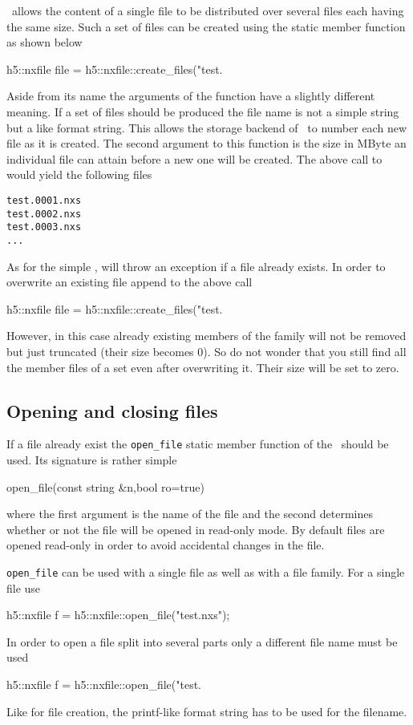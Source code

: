\libpniio\ allows the content of a single file to be distributed over several
files each having the same size. Such a set of files can be created using the 
 static member function as shown below
\begin{cppcode}
h5::nxfile file = h5::nxfile::create_files("test.%
\end{cppcode}
Aside from its name the arguments of the  function have 
a slightly different meaning. If a set of files should be produced the file name
is not a simple string but a  like format string. This allows the
storage backend of \libpniio\ to number each new file as it is created.
The second argument to this function is the size in MByte an individual file can 
attain before a new one will be created. The above call to 
would yield the following files
\begin{verbatim}
test.0001.nxs
test.0002.nxs
test.0003.nxs
...
\end{verbatim}
As for the simple ,  will throw an
 exception if a file already exists. In order to overwrite an
existing file append  to the above call 
\begin{cppcode}
h5::nxfile file = h5::nxfile::create_files("test.%
\end{cppcode}
However, in this case already existing members of the family will not be removed
but just truncated (their size becomes $0$). So do not wonder that you still
find all the member files of a set even after overwriting it. Their size will be
set to zero.

\subsection{Opening and closing files}

If a file already exist the \texttt{open\_file} static member function of the
\nxfile\ should be used.  Its signature is rather simple 
\begin{cppcode}
open_file(const string &n,bool ro=true)
\end{cppcode}
where the first argument is the name of the file and the second determines
whether or not the file will be opened in read-only mode. By default files are
opened read-only in order to avoid accidental changes in the file. 

\texttt{open\_file} can be used with a single file as well as with a file
family. For a single file use 
\begin{cppcode}
h5::nxfile f = h5::nxfile::open_file("test.nxs");
\end{cppcode}
In order to open a file split into several parts only a different file name 
must be used
\begin{cppcode}
h5::nxfile f = h5::nxfile::open_file("test.%
\end{cppcode}
Like for file creation, the printf-like format string has to be used for the 
filename. 

